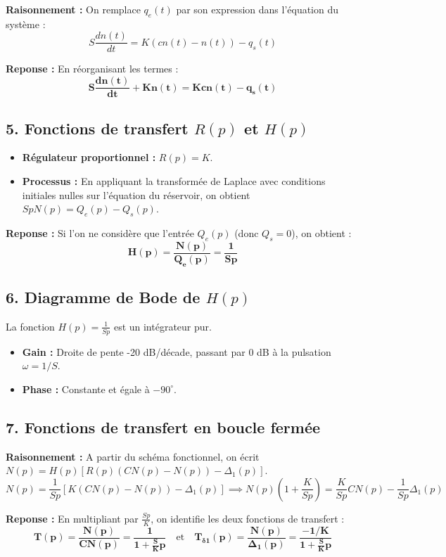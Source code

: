 \documentclass[11pt,a4paper]{article}
\begin{document}
\textbf{Raisonnement :} On remplace $q_e(t)$ par son expression dans l'équation du système :
$$
S \frac{dn(t)}{dt} = K(cn(t) - n(t)) - q_s(t)
$$

\textbf{Reponse :} En réorganisant les termes :
$$
\mathbf{S \frac{dn(t)}{dt} + K n(t) = K cn(t) - q_s(t)}
$$

\subsection*{5. Fonctions de transfert $R(p)$ et $H(p)$}

\begin{itemize}
    \item \textbf{Régulateur proportionnel :} $R(p) = K$.
    \item \textbf{Processus :} En appliquant la transformée de Laplace avec conditions initiales nulles sur l'équation du réservoir, on obtient $S p N(p) = Q_e(p) - Q_s(p)$.
\end{itemize}

\textbf{Reponse :} Si l'on ne considère que l'entrée $Q_e(p)$ (donc $Q_s=0$), on obtient :
$$
\mathbf{H(p) = \frac{N(p)}{Q_e(p)} = \frac{1}{S p}}
$$

\subsection*{6. Diagramme de Bode de $H(p)$}

La fonction $H(p) = \frac{1}{Sp}$ est un intégrateur pur.
\begin{itemize}
    \item \textbf{Gain :} Droite de pente -20 dB/décade, passant par 0 dB à la pulsation $\omega = 1/S$.
    \item \textbf{Phase :} Constante et égale à $-90^\circ$.
\end{itemize}

\subsection*{7. Fonctions de transfert en boucle fermée}

\textbf{Raisonnement :} A partir du schéma fonctionnel, on écrit $N(p) = H(p) [R(p)(CN(p) - N(p)) - \Delta_1(p)]$.
$$
N(p) = \frac{1}{Sp} [K(CN(p) - N(p)) - \Delta_1(p)] \implies N(p) \left(1 + \frac{K}{Sp}\right) = \frac{K}{Sp} CN(p) - \frac{1}{Sp} \Delta_1(p)
$$

\textbf{Reponse :} En multipliant par $\frac{Sp}{K}$, on identifie les deux fonctions de transfert :
$$
\mathbf{T(p) = \frac{N(p)}{CN(p)} = \frac{1}{1 + \frac{S}{K}p}} \quad \text{et} \quad \mathbf{T_{\delta 1}(p) = \frac{N(p)}{\Delta_1(p)} = \frac{-1/K}{1 + \frac{S}{K}p}}
$$
\end{document}
